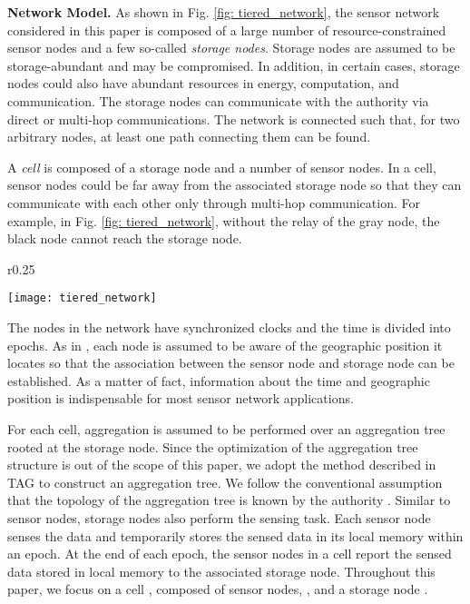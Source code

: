 \documentclass[conference]{IEEEtran}
\begin{document}
\textbf{Network Model.} As shown in Fig. \ref{fig: tiered_network}, the sensor network considered in this paper is composed of a large number of resource-constrained sensor nodes and a few so-called \emph{storage nodes}. Storage nodes are assumed to be storage-abundant and may be compromised. In addition, in certain cases, storage nodes could also have abundant resources in energy, computation, and communication. The storage nodes can communicate with the authority via direct or multi-hop communications. The network is connected such that, for two arbitrary nodes, at least one path connecting them can be found.

A \emph{cell} is composed of a storage node and a number of sensor nodes. In a cell, sensor nodes could be far away from the associated storage node so that they can communicate with each other only through multi-hop communication. For example, in Fig. \ref{fig: tiered_network}, without the relay of the gray node, the black node cannot reach the storage node. \begin{wrapfigure}{r}{0.25\textwidth}
  \begin{center}
    \texttt{[image: tiered\_network]}
  \end{center}
  \caption{\footnotesize A tiered sensor network.}
  \label{fig: tiered_network}
\end{wrapfigure} The nodes in the network have synchronized clocks \cite{snwlz06} and the time is divided into epochs. As in \cite{sl08,slm06,szz09,zsz09}, each node is assumed to be aware of the geographic position it locates \cite{lnd05,zlfw06} so that the association between the sensor node and storage node can be established. As a matter of fact, information about the time and geographic position is indispensable for most sensor network applications.

For each cell, aggregation is assumed to be performed over an aggregation tree rooted at the storage node. Since the optimization of the aggregation tree structure is out of the scope of this paper, we adopt the method described in TAG \cite{mfhh02} to construct an aggregation tree. We follow the conventional assumption that the topology of the aggregation tree is known by the authority \cite{cp08,cps06}. Similar to sensor nodes, storage nodes also perform the sensing task. Each sensor node senses the data and temporarily stores the sensed data in its local memory within an epoch. At the end of each epoch, the sensor nodes in a cell report the sensed data stored in local memory to the associated storage node. Throughout this paper, we focus on a cell , composed of  sensor nodes, , and a storage node .
\end{document}
